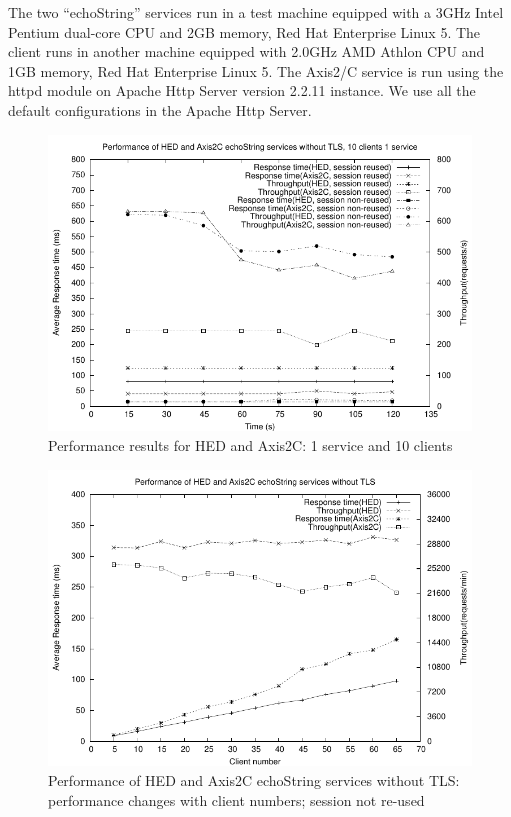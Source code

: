 \documentclass[conference]{IEEEtran}
\begin{document}
The two ``echoString'' services run in a test machine equipped with a 3GHz Intel
Pentium dual-core CPU and 2GB memory, Red Hat Enterprise Linux 5. The client runs in another
machine equipped with 2.0GHz AMD Athlon CPU and 1GB memory, Red Hat Enterprise Linux 5. The
Axis2/C service is run using the httpd module on Apache Http Server version 2.2.11 instance. We use all the
default configurations in the Apache Http Server.

\begin{figure}
\includegraphics[width=0.9\columnwidth]{HED2Axis_thread10.pdf}
\caption{Performance results for HED and Axis2C: 1 service and 10 clients}
\label{fig:HED2Axis_thread10}
\end{figure}

\begin{figure}
\includegraphics[width=0.9\columnwidth]{TCP_thread_all.pdf}
\caption{Performance of HED and Axis2C echoString services without TLS:
performance
changes with client numbers; session not re-used }
\label{fig:TCP_thread_all}
\end{figure}
\end{document}

